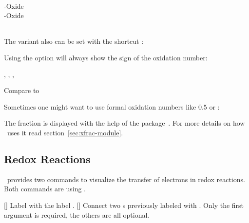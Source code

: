\documentclass{chemmacros-manual}
\begin{document}
\begin{example}
    \\
  -Oxide \\
  -Oxide \\
   \\
\end{example}

The  variant also can be set with the shortcut \sarg:
\begin{example}
   
\end{example}

Using the  option will always show the sign of the
oxidation number:
\begin{example}
  , , , 
\end{example}

\begin{example}
  Compare  to 
\end{example}

Sometimes one might want to use formal oxidation numbers like \num{.5} or
:
\begin{example}

\end{example}

The fraction is displayed with the help of the 
package~\cite{bnd:l3packages}.  For more details on how \chemmacros\ uses it
read section~\vref{sec:xfrac-module}.

\subsection{Redox Reactions}\label{sec:redox-reactions}

\chemmacros\ provides two commands to visualize the transfer of electrons in
redox reactions.  Both commands are using \TikZ.
\begin{commands}
  []
    Label  with the label .
  []
    Connect two s previously labeled with .  Only the first
    argument  is required, the others are all
    optional.
\end{commands}
\end{document}
